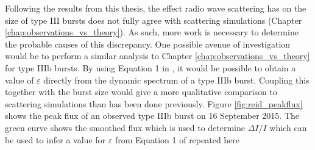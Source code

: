 %
%
Following the results from this thesis, the effect radio wave scattering has on the size of type III bursts does not fully agree with scattering simulations (Chapter \ref{chap:observations_vs_theory}). As such, more work is necessary to determine the probable causes of this discrepancy. One possible avenue of investigation would be to perform a similar analysis to Chapter \ref{chap:observations_vs_theory} for type IIIb bursts. By using Equation 1 in \cite{Reid2021}, it would be possible to obtain a value of $\varepsilon$ directly from the dynamic spectrum of a type IIIb burst. Coupling this together with the burst size would give a more qualitative comparison to scattering simulations than has been done previously. Figure \ref{fig:reid_peakflux} shows the peak flux of an observed type IIIb burst on 16 September 2015. The green curve shows the smoothed flux which is used to determine $\Delta I/I$ which can be used to infer a value for $\varepsilon$ from Equation 1 of \cite{Reid2021} repeated here

